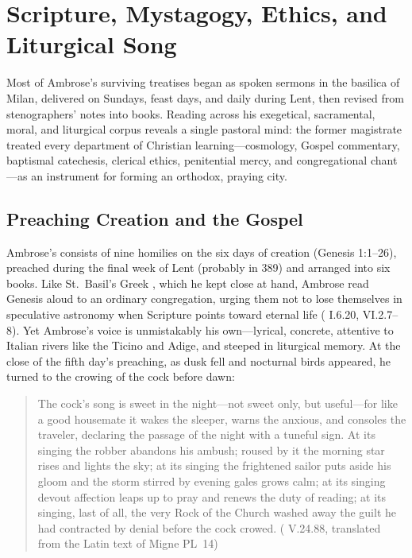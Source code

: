 \section{Scripture, Mystagogy, Ethics, and Liturgical Song}

Most of Ambrose's surviving treatises began as spoken sermons in the basilica of Milan, delivered on Sundays, feast days, and daily during Lent, then revised from stenographers' notes into books. Reading across his exegetical, sacramental, moral, and liturgical corpus reveals a single pastoral mind: the former magistrate treated every department of Christian learning---cosmology, Gospel commentary, baptismal catechesis, clerical ethics, penitential mercy, and congregational chant---as an instrument for forming an orthodox, praying city.

\subsection{Preaching Creation and the Gospel}

Ambrose's  consists of nine homilies on the six days of creation (Genesis 1:1--26), preached during the final week of Lent (probably in 389) and arranged into six books. Like St.~Basil's Greek , which he kept close at hand, Ambrose read Genesis aloud to an ordinary congregation, urging them not to lose themselves in speculative astronomy when Scripture points toward eternal life ( I.6.20, VI.2.7--8). Yet Ambrose's voice is unmistakably his own---lyrical, concrete, attentive to Italian rivers like the Ticino and Adige, and steeped in liturgical memory. At the close of the fifth day's preaching, as dusk fell and nocturnal birds appeared, he turned to the crowing of the cock before dawn:

\begin{quote}
The cock's song is sweet in the night---not sweet only, but useful---for like a good housemate it wakes the sleeper, warns the anxious, and consoles the traveler, declaring the passage of the night with a tuneful sign. At its singing the robber abandons his ambush; roused by it the morning star rises and lights the sky; at its singing the frightened sailor puts aside his gloom and the storm stirred by evening gales grows calm; at its singing devout affection leaps up to pray and renews the duty of reading; at its singing, last of all, the very Rock of the Church washed away the guilt he had contracted by denial before the cock crowed. ( V.24.88, translated from the Latin text of Migne PL~14)
\end{quote}

